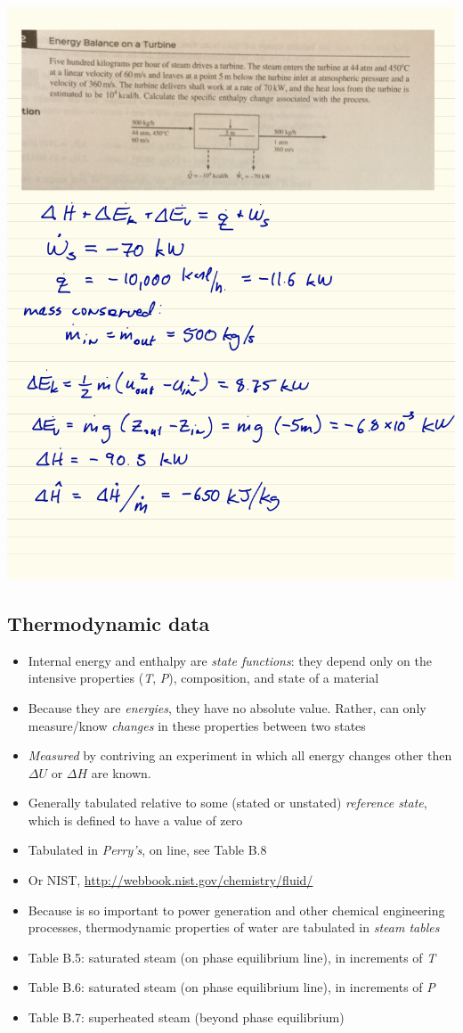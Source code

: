 \documentclass[11pt]{article}
\begin{document}
\includegraphics[width=.9\linewidth]{./figs/Turbine1.png}

\subsection{Thermodynamic data}
\label{sec-9-4}
\begin{itemize}
\item Internal energy and enthalpy are \emph{state functions}: they depend only on the intensive properties (\emph{T}, \emph{P}), composition, and state of a material
\item Because they are \emph{energies}, they have no absolute value.  Rather, can only measure/know \emph{changes} in these properties between two states
\item \emph{Measured} by contriving an experiment in which all energy changes other then \(\Delta{U}\) or \(\Delta{H}\) are known.
\item Generally tabulated relative to some (stated or unstated) \emph{reference state}, which is defined to have a value of zero
\item Tabulated in \emph{Perry's}, on line, see Table B.8
\item Or NIST, \url{http://webbook.nist.gov/chemistry/fluid/}

\item Because  is so important to power generation and other chemical engineering processes, thermodynamic properties of water are tabulated  in \emph{steam tables}
\item Table B.5: saturated steam (on phase equilibrium line), in increments of \emph{T}
\item Table B.6: saturated steam (on phase equilibrium line), in increments of \emph{P}
\item Table B.7: superheated steam (beyond phase equilibrium)
\end{itemize}
\end{document}
